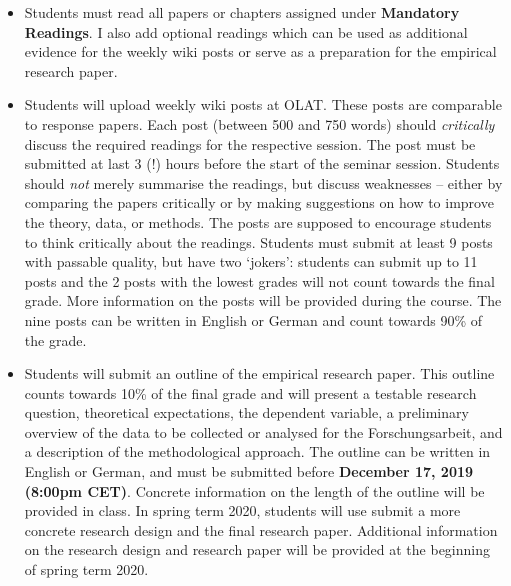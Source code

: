 \documentclass[abstract=on,parskip=full,headings=standardclasses,fontsize=11pt,paper=a4]{scrartcl}
\begin{document}
\begin{itemize}
\item Students  must  read all papers or chapters assigned under \textbf{Mandatory Readings}.  I also add optional readings which can be used as additional evidence for the weekly wiki posts or serve as a preparation for the empirical research paper.

\item Students will upload  weekly wiki posts  at OLAT. These posts are comparable to response papers. Each post (between 500 and 750 words) should \textit{critically} discuss the required readings for the respective session. The post must be submitted  at last 3 (!) hours before the start of the seminar session. Students should \textit{not}  merely summarise the readings, but  discuss weaknesses -- either by comparing the papers critically  or by making suggestions on how to improve the theory, data, or methods.  The posts are supposed to encourage students to think critically about the readings.  Students must submit at least 9 posts with passable quality, but have two `jokers': students can submit up to 11 posts and the 2 posts with the lowest grades will not count towards the final grade. More information on the posts will be provided during the course. The nine posts can be written in English or German and  count towards 90\% of the grade. 

\item Students will submit an outline of the empirical research paper. This outline counts towards 10\% of the final grade and will present a testable research question,  theoretical expectations,  the dependent variable, a preliminary overview of the data to be collected or analysed for the Forschungsarbeit, and a description of the methodological approach. The outline can be written in English or German, and must be submitted before \textbf{December 17, 2019 (8:00pm CET)}. Concrete information on the length of the outline will be provided in class.  In spring term 2020, students will use submit a  more concrete research design and the final research paper. Additional information on the research design and research paper will be provided at the beginning of spring term 2020.




\end{itemize}
\end{document}
